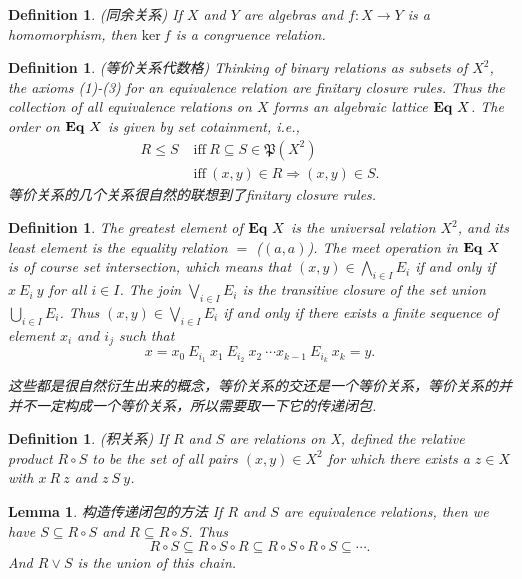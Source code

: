 \documentclass{article}
\newtheorem{lemma}[theorem]{Lemma}
\newtheorem{definition}[theorem]{Definition}
\newcommand*{\xfunc}[4]{{#2}\colon{#3}{#1}{#4}}
\newcommand*{\func}[3]{\xfunc{\to}{#1}{#2}{#3}}
\newcommand\eql[1]{\ensuremath\mathbf{Eq}~{#1}}
\begin{document}
\begin{definition}
\rm {\color{red}(同余关系)} If $X$ and $Y$ are algebras and $\func{f}{X}{Y}$ is a homomorphism, then $\text{ker}~f$ is a {\color{red} congruence relation}.
\end{definition}

\begin{definition}
\rm {\color{red}(等价关系代数格)} Thinking of binary relations as subsets of $X^2$, the axioms (1)-(3) for an equivalence relation are finitary closure rules. Thus the collection of all equivalence relations on $X$ forms an algebraic lattice $\eql{X}$. The order on $\eql{X}$ is given by set cotainment, i.e.,
$$
\begin{aligned}
R \leq S\;& \text{iff}~R \subseteq S \in \mathfrak{P}(X^2)\\
& \text{iff}~(x,y) \in R \Rightarrow (x,y) \in S.
\end{aligned}
$$
{\color{blue} 等价关系的几个关系很自然的联想到了finitary closure rules}.
\end{definition}

\begin{definition}
\rm The {\color{red} greatest element} of $\eql{X}$ is the universal relation $X^2$, and its {\color{red} least element} is the equality relation $=$ ($(a,a)$). The meet operation in $\eql{X}$ is of course set intersection, which means that $(x,y) \in \bigwedge\limits_{i \in I} E_i$ if and only if $x~E_i~y$ for all $i \in I$. The join $\bigvee\limits_{i \in I} E_i$ is the transitive closure of the set union $\bigcup\limits_{i \in I} E_i$. Thus $(x,y) \in \bigvee\limits_{i \in I} E_i$ if and only if there exists a finite sequence of element $x_i$ and $i_j$ such that 
$$
x = x_0~E_{i_1}~x_1~E_{i_2}~x_2~\cdots x_{k-1}~E_{i_k}~x_k = y.
$$

{\color{blue} 这些都是很自然衍生出来的概念，等价关系的交还是一个等价关系，等价关系的并并不一定构成一个等价关系，所以需要取一下它的传递闭包}.
\end{definition}

\begin{definition}
\rm {\color{red}(积关系)} If $R$ and $S$ are relations on X, defined the relative product $R\circ S$ to be the set of all pairs $(x,y) \in X^2$ for which there exists a $z \in X$ with $x~R~z$ and $z~S~y$.
\end{definition}

\begin{lemma}
\rm {\color{red} 构造传递闭包的方法} If $R$ and $S$ are equivalence relations, then we have $S \subseteq R \circ S$ and $R \subseteq R \circ S$. Thus
$$
	R \circ S \subseteq R \circ S \circ R \subseteq R \circ  S \circ R \circ S \subseteq \cdots.
$$
And $R \vee S$ is the union of this chain.
\end{lemma}
\end{document}
